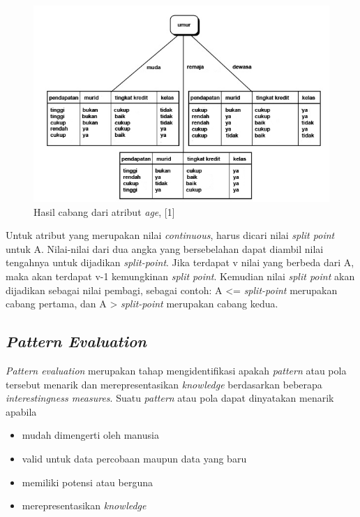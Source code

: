 \begin{figure}
\includegraphics[scale=1]{Gambar/hasilcabangid3.jpg}
\caption[Hasil pohon faktor pada atribut \textsl{age} dari table 2.1, [1]{Hasil cabang dari atribut \textsl{age}, [1]} 
\end{figure}

Untuk atribut yang merupakan nilai \textsl{continuous}, harus dicari nilai \textsl{split point} untuk A. Nilai-nilai dari dua angka yang bersebelahan dapat diambil nilai tengahnya untuk dijadikan \textsl{split-point}. Jika terdapat v nilai yang berbeda dari A, maka akan terdapat v-1 kemungkinan \textsl{split point}. Kemudian nilai \textsl{split point} akan dijadikan sebagai nilai pembagi, sebagai contoh: A <= \textsl{split-point} merupakan cabang pertama, dan A > \textsl{split-point} merupakan cabang kedua.

 

\subsection{\textsl{Pattern Evaluation}}
\textsl{Pattern evaluation} merupakan tahap mengidentifikasi apakah \textsl{pattern} atau pola tersebut menarik dan merepresentasikan \textsl{knowledge} berdasarkan beberapa \textsl{interestingness measures}.
Suatu \textsl{pattern} atau pola dapat dinyatakan menarik apabila
\begin{itemize}
	\item mudah dimengerti oleh manusia
	\item valid untuk data percobaan maupun data yang baru
	\item memiliki potensi atau berguna
	\item merepresentasikan \textsl{knowledge}
\end{itemize}


